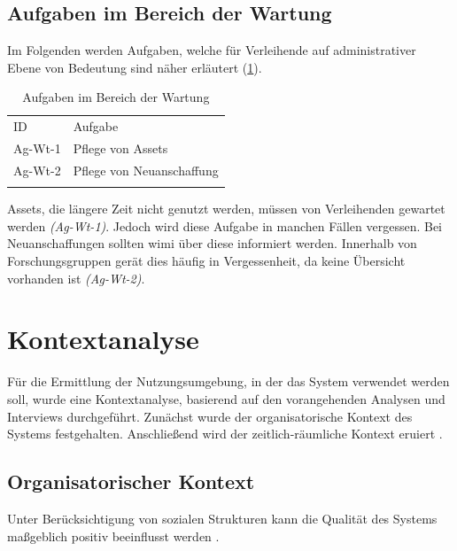 \subsection{Aufgaben im Bereich der Wartung}
\label{subsec:wartung}
Im Folgenden werden Aufgaben, welche für Verleihende auf administrativer Ebene von Bedeutung sind
näher erläutert (\ref{table:Ag-Wt}).

\begin{table}[h]
        \centering
        \caption{Aufgaben im Bereich der Wartung}
        \begin{tabular}{ll}
                \arrayrulecolor{maincolor}\hline
                \sffamily\color{maincolor}ID & \sffamily\color{maincolor}Aufgabe \\
                \arrayrulecolor{maincolor}\hline
                Ag-Wt-1                      & Pflege von Assets \\
                Ag-Wt-2                      & Pflege von Neuanschaffung \\
                \arrayrulecolor{maincolor}\hline
        \end{tabular}
        \label{table:Ag-Wt}
\end{table}

Assets, die längere Zeit nicht genutzt werden, müssen von Verleihenden gewartet werden
\textit{(Ag-Wt-1)}. Jedoch wird diese Aufgabe in manchen Fällen vergessen. Bei Neuanschaffungen
sollten \ac{wimi} über diese informiert werden. Innerhalb von Forschungsgruppen gerät dies häufig in
Vergessenheit, da keine Übersicht vorhanden ist \textit{(Ag-Wt-2)}.


\section{Kontextanalyse}
\label{section:kontext}

Für die Ermittlung der Nutzungsumgebung, in der das System verwendet werden soll, wurde eine
Kontextanalyse, basierend auf den vorangehenden Analysen und Interviews durchgeführt. Zunächst wurde
der organisatorische Kontext des Systems festgehalten. Anschließend wird der zeitlich-räumliche
Kontext eruiert \cite{herczeg_software-ergonomie_2018}.

\subsection{Organisatorischer Kontext}
Unter Berücksichtigung von sozialen Strukturen kann die Qualität des Systems maßgeblich positiv
beeinflusst werden \cite{herczeg_software-ergonomie_2018}.

